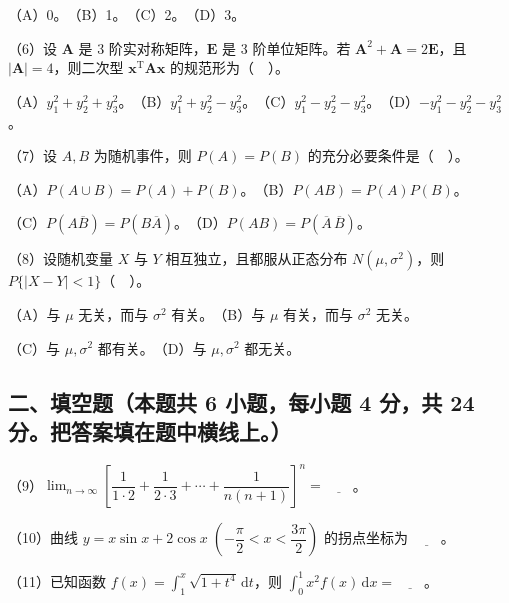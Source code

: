 \documentclass[UTF8,12pt]{ctexart}
\begin{document}
（A）0。　（B）1。　（C）2。　（D）3。


（6）设 \(\displaystyle \boldsymbol A\) 是 3 阶实对称矩阵，\(\displaystyle \boldsymbol E\) 是 3 阶单位矩阵。若 \(\displaystyle \boldsymbol A^2+\boldsymbol A=2\boldsymbol E\)，且 \(\displaystyle |\boldsymbol A|=4\)，则二次型 \(\displaystyle \boldsymbol x^{\mathrm T}\boldsymbol A\boldsymbol x\) 的规范形为（　）。


（A）\(\displaystyle y_1^2+y_2^2+y_3^2\)。　（B）\(\displaystyle y_1^2+y_2^2-y_3^2\)。　（C）\(\displaystyle y_1^2-y_2^2-y_3^2\)。　（D）\(\displaystyle -y_1^2-y_2^2-y_3^2\)。


（7）设 \(\displaystyle A,\allowbreak B\) 为随机事件，则 \(\displaystyle P(A)=P(B)\) 的充分必要条件是（　）。


（A）\(\displaystyle P(A\cup B)=P(A)+P(B)\)。　（B）\(\displaystyle P(AB)=P(A)P(B)\)。


（C）\(\displaystyle P(A\overline B)=P(B\overline A)\)。　（D）\(\displaystyle P(AB)=P(\overline A\,\overline B)\)。


（8）设随机变量 \(\displaystyle X\) 与 \(\displaystyle Y\) 相互独立，且都服从正态分布 \(\displaystyle N(\mu,\allowbreak \sigma^2)\)，则 \(\displaystyle P\{|X-Y|<1\}\)（　）。


（A）与 \(\displaystyle \mu\) 无关，而与 \(\displaystyle \sigma^2\) 有关。　（B）与 \(\displaystyle \mu\) 有关，而与 \(\displaystyle \sigma^2\) 无关。


（C）与 \(\displaystyle \mu,\allowbreak \sigma^2\) 都有关。　（D）与 \(\displaystyle \mu,\allowbreak \sigma^2\) 都无关。


\subsection*{二、填空题（本题共 6 小题，每小题 4 分，共 24 分。把答案填在题中横线上。）}

（9）\(\displaystyle \lim_{n\to\infty}\left[\dfrac{\displaystyle 1}{\displaystyle 1\cdot2}+\dfrac{\displaystyle 1}{\displaystyle 2\cdot3}+\cdots+\dfrac{\displaystyle 1}{\displaystyle n(n+1)}\right]^n=\underline{\qquad}\)。


（10）曲线 \(\displaystyle y=x\sin x+2\cos x\;(-\dfrac{\displaystyle \pi}{\displaystyle 2}<x<\dfrac{\displaystyle 3\pi}{\displaystyle 2})\) 的拐点坐标为 \(\displaystyle \underline{\qquad}\)。


（11）已知函数 \(\displaystyle f(x)=\displaystyle \int_1^x\sqrt{1+t^4}\,\mathrm dt\)，则 \(\displaystyle \int_0^1x^2f(x)\,\mathrm dx=\underline{\qquad}\)。
\end{document}
